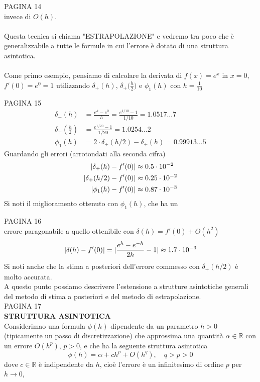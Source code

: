 \documentclass[12pt,a4paper]{article}
\DeclarePairedDelimiter{\abs}{\lvert}{\rvert}
\begin{document}
PAGINA 14 \\%
invece di $O(h)$.\\
\vspace{0.1cm}\\
Questa tecnica si chiama "ESTRAPOLAZIONE" e vedremo tra poco che è generalizzabile a tutte le formule in cui l'errore è dotato di una struttura asintotica.\\
\vspace{0.1cm}\\
Come primo esempio, pensiamo di calcolare la derivata di $f(x)=e^x$ in $x=0$, $f'(0)=e^0=1$ utilizzando $\delta_+(h)$, $\delta_+\bigl(\frac{h}{2}\bigr)$ e $\phi_1(h)$ con $h=\frac{1}{10}$

PAGINA 15 \\ %
\[
\begin{split}
    \delta_+ (h) & = \frac{e^h - e^0}{h} = \frac{e^{1/10} - 1}{1/10} = 1.0517 \dotso 7 \\
    \delta_+ (\frac{h}{2}) & = \frac{e^{1/20} - 1}{1/20} = 1.0254 \dotso 2 \\
    \phi_1 (h) & = 2 \cdot \delta_+ (h/2) - \delta_+ (h) = 0.99913 \dotso 5
\end{split}
\]
Guardando gli errori (arrotondati alla seconda cifra)
\[
\begin{split}
    \abs{\delta_+ (h) - f'(0)} & \approx 0.5 \cdot 10^{-2} \\
    \abs{\delta_+ (h/2) - f'(0)} & \approx 0.25 \cdot 10^{-2} \\
    \abs{\phi_1 (h) - f'(0)} & \approx 0.87 \cdot 10^{-3}
\end{split}
\]
Si noti il miglioramento ottenuto con $\phi_1 (h)$, che ha un

PAGINA 16 \\ %
errore paragonabile a quello ottenibile con $\delta (h) = f'(0) + O(h^2)$
\[
\abs{\delta (h) - f'(0)} = \abs{\frac{e^h - e^{-h}}{2h} - 1} \approx 1.7 \cdot 10^{-3}
\]
Si noti anche che la stima a posteriori dell'errore commesso con $\delta_+ (h/2)$ è molto accurata.\\
A questo punto possiamo descrivere l'estensione a strutture asintotiche generali del metodo di stima a posteriori e del metodo di estrapolazione.\\

PAGINA 17 \\ %
\textbf{STRUTTURA ASINTOTICA}\\
Considerimao una formula $\phi (h)$ dipendente da un parametro $h>0$ (tipicamente un passo di discretizzazione) che approssima una quantità $\alpha \in \mathbb{R}$ con un errore $O(h^p)$, $p>0$, e che ha la seguente struttura asintotica
\[
\phi (h) = \alpha + ch^p + O(h^q), \quad q>p>0
\]
dove $c \in \mathbb{R}$ è indipendente da $h$, cioè l'errore è un infinitesimo di ordine $p$ per $h \to 0$,
\end{document}
